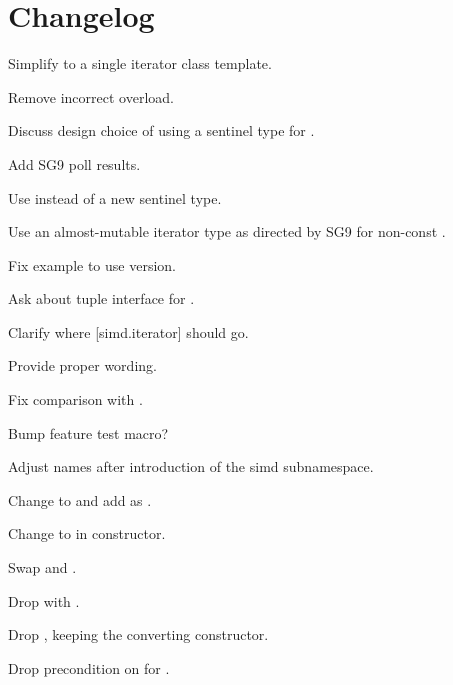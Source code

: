 \section{Changelog}
\begin{revision}
\item Simplify to a single iterator class template.
\item Remove incorrect  overload.
\item Discuss design choice of using a sentinel type for .
\end{revision}

\begin{revision}
\item Add SG9 poll results.
\item Use  instead of a new sentinel type.
\item Use an almost-mutable iterator type as directed by SG9 for
  non-const .
\item Fix  example to use  version.
\end{revision}

\begin{revision}
\item Ask about tuple interface for .
\item Clarify where [simd.iterator] should go.
\item Provide proper wording.
\item Fix \code{<=>} comparison with .
\item Bump feature test macro?
\end{revision}

\begin{revision}
\item Adjust names after introduction of the simd subnamespace.
\end{revision}

\begin{revision}
\item Change  to  and add  as .
\item Change  to \textit{} in constructor.
\item Swap  and .
\item Drop  with .
\item Drop , keeping the converting constructor.
\item Drop precondition on \textit{} for .
\end{revision}

